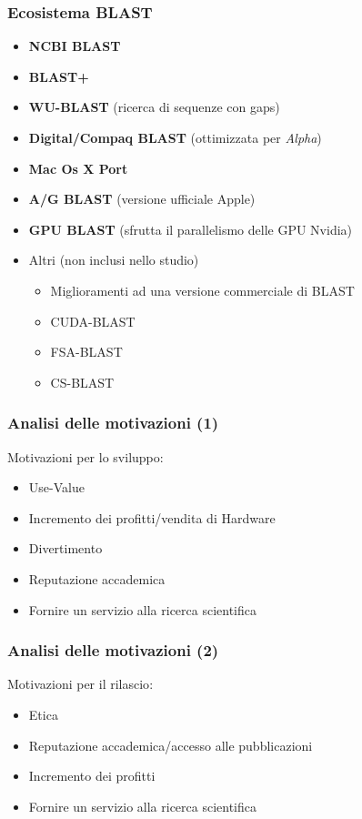 \begin{frame}\frametitle{Ecosistema BLAST}

\begin{itemize}[<+->]
\itemsep1pt\parskip0pt
\item
  \alert{\textbf{NCBI BLAST}}
\item
  \alert{\textbf{BLAST+}}
\item
  \textbf{WU-BLAST} (ricerca di sequenze con gaps)
\item
  \textbf{Digital/Compaq BLAST} (ottimizzata per \emph{Alpha})
\item
  \textbf{Mac Os X Port}
\item
  \textbf{A/G BLAST} (versione ufficiale Apple)
\item
  \textbf{GPU BLAST} (sfrutta il parallelismo delle GPU Nvidia)
\item
  Altri (non inclusi nello studio)

  \begin{itemize}[<+->]
  \itemsep1pt\parskip0pt
  \item
    Miglioramenti ad una versione commerciale di BLAST
  \item
    CUDA-BLAST
  \item
    FSA-BLAST
  \item
    CS-BLAST
  \end{itemize}
\end{itemize}

\end{frame}

\begin{frame}\frametitle{Analisi delle motivazioni (1)}

Motivazioni per lo \alert{sviluppo}:

\begin{itemize}[<+->]
\itemsep1pt\parskip0pt
\item
  Use-Value
\item
  Incremento dei profitti/vendita di Hardware
\item
  Divertimento
\item
  Reputazione accademica
\item
  Fornire un servizio alla ricerca scientifica
\end{itemize}

\end{frame}

\begin{frame}\frametitle{Analisi delle motivazioni (2)}

Motivazioni per il \alert{rilascio}:

\begin{itemize}[<+->]
\itemsep1pt\parskip0pt
\item
  Etica
\item
  Reputazione accademica/accesso alle pubblicazioni
\item
  Incremento dei profitti
\item
  Fornire un servizio alla ricerca scientifica
\end{itemize}

\end{frame}

